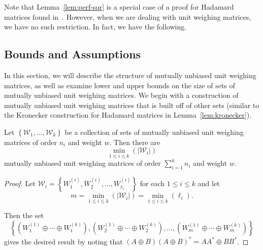Note that Lemma~\ref{lem:perf-sqr} is a special case of a proof for Hadamard matrices found in~\cite{real-mub}. However, when we are dealing with unit weighing matrices, we have no such restriction. In fact, we have the following.

\subsection[Bounds and Assumptions]{Bounds and Assumptions}
\label{subsec:bounds-assumptions}

In this section, we will describe the structure of mutually unbiased unit weighing matrices, as well as examine lower and upper bounds on the size of sets of mutually unbiased unit weighing matrices. We begin with a construction of mutually unbiased unit weighing matrices that is built off of other sets (similar to the Kronecker construction for Hadamard matrices in Lemma~\ref{lem:kronecker}).

\begin{theorem}\label{th:direct-sum}
 Let $\left\{\mathcal{W}_1,\dots,\mathcal{W}_k\right\}$ be a collection of sets of mutually unbiased unit weighing matrices of order $n_i$ and weight $w$. Then there are $$\min_{1 \leq i \leq k}\left(\left|\mathcal{W}_i\right|\right)$$ mutually unbiased unit weighing matrices of order $\sum_{i=1}^{k} n_i$ and weight $w$.
 \begin{proof}
  Let $\mathcal{W}_i = \left\{W_1^{(i)},W_2^{(i)},\dots,W_{\ell_i}^{(i)}\right\}$ for each $1 \leq i \leq k$ and let $$m = \min_{1 \leq i \leq k}\left(\left|\mathcal{W}_i\right|\right) = \min_{1 \leq i \leq k}\left(\ell_i\right).$$

  Then the set $$\left\{\left(W_1^{(1)} \oplus \cdots \oplus W_1^{(k)}\right),
                        \left(W_2^{(1)} \oplus \cdots \oplus W_2^{(k)}\right),
                               \dots
                       ,\left(W_m^{(1)} \oplus \cdots \oplus W_m^{(k)}\right)
                 \right\}$$ gives the desired result by noting that $(A \oplus B)(A \oplus B)^* = AA^* \oplus BB^*$.
 \end{proof}
\end{theorem}

